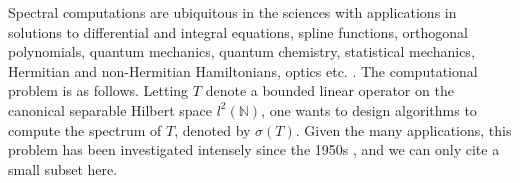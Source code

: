 \documentclass[a4paper,10pt]{article}
\begin{document}
Spectral computations are ubiquitous in the sciences with applications in solutions to differential and integral equations, spline functions, orthogonal polynomials, quantum mechanics, quantum chemistry, statistical mechanics, Hermitian and non-Hermitian Hamiltonians, optics etc. \cite{ponomarenko2013cloning,dean2013hofstadter,szabo2012modern,bender2007making,davies2007linear,shivakumar2016infinite,simon1998classical,gray2006toeplitz}. The computational problem is as follows. Letting $T$ denote a bounded linear operator on the canonical separable Hilbert space $l^2(\mathbb{N})$, one wants to design algorithms to compute the spectrum of $T$, denoted by $\sigma(T)$. Given the many applications, this problem has been investigated intensely since the 1950s \cite{aronszajn1951approximation, Arveson_cnum_lin94, Arveson_role_of94,Arveson_Improper93, Bottcher_appr, brown2007quasi, Lyonell_2, Sharg, deift1985toda, digernes1994finite, hansen2008, hansen2011, Levitin, Marletta_pollution, Marletta_Spec_gaps, trefethen2005spectra, Arieh1, Arieh2, Davies_sec_order, Seidel_JFA, SeSi_Pseudospectra, Eugene3, Silbermann22, Hansen_PRS, riddell1967spectral}, and we can only cite a small subset here. 
\end{document}
